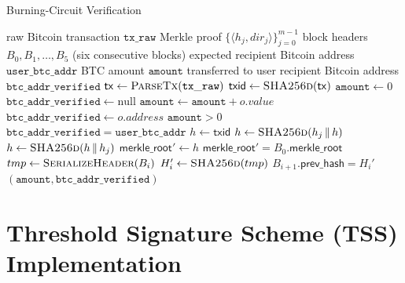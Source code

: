 \documentclass{DESSThesis}
\begin{document}
\begin{algorithm}
\caption{Burning-Circuit Verification}
\label{alg:burning_circuit_core_high_level}
\begin{algorithmic}[1] %
    \Require raw Bitcoin transaction $\mathtt{tx\_raw}$
    \Require Merkle proof $\bigl\{\langle h_j,\textit{dir}_j\rangle\bigr\}_{j=0}^{m-1}$
    \Require block headers $B_0,B_1,\dots,B_5$ (six consecutive blocks)
    \Require expected recipient Bitcoin address $\mathtt{user\_btc\_addr}$
    \Statex
    \Ensure BTC amount $\mathtt{amount}$ transferred to user
    \Ensure recipient Bitcoin address $\mathtt{btc\_addr\_verified}$
    \Statex
    \State $\mathsf{tx} \gets \Call{ParseTx}{\mathtt{tx\_raw}}$
    \State $\mathsf{txid} \gets \Call{SHA256d}{\mathsf{tx}}$
    \State $\mathtt{amount} \gets 0$
    \State $\mathtt{btc\_addr\_verified} \gets \text{null}$
        \State $\mathtt{amount} \gets \mathtt{amount} + o.\textit{value}$
        \State $\mathtt{btc\_addr\_verified} \gets o.\textit{address}$
      \EndIf
    \EndFor
    \Assert $\mathtt{amount} > 0$
    \Assert $\mathtt{btc\_addr\_verified} = \mathtt{user\_btc\_addr}$
    \Statex
    \State $h \gets \mathsf{txid}$  
        \State $h \gets \Call{SHA256d}{h_j \,\|\, h}$
      \Else
        \State $h \gets \Call{SHA256d}{h \,\|\, h_j}$
      \EndIf
    \EndFor
    \State $\mathsf{merkle\_root}' \gets h$
    \Assert $\mathsf{merkle\_root}' = B_0.\mathsf{merkle\_root}$
    \Statex
        \State $tmp \gets \Call{SerializeHeader}{B_i}$
        \State $H_i' \gets \Call{SHA256d}{tmp}$
        \Assert $B_{i+1}.\mathsf{prev\_hash} = H_i'$
    \EndFor
    \Statex
    \Return $(\mathtt{amount},\mathtt{btc\_addr\_verified})$
\end{algorithmic}
\end{algorithm}

\section{Threshold Signature Scheme (TSS) Implementation}
\end{document}
